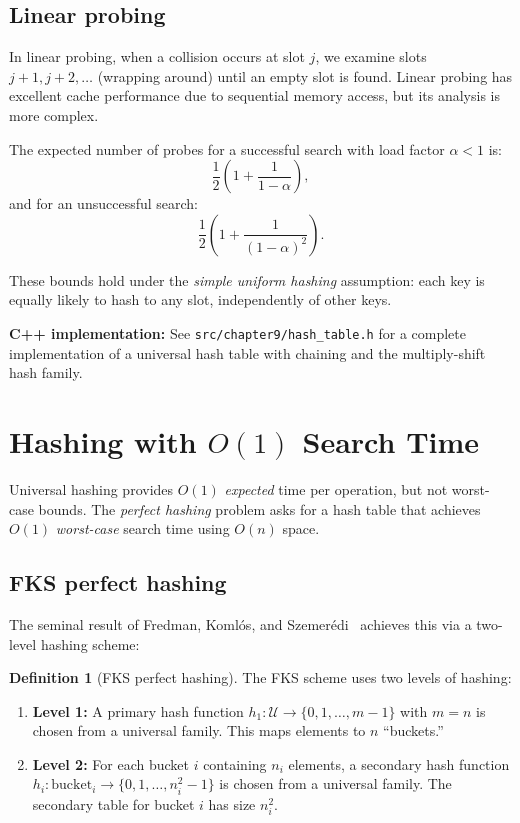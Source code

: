 \documentclass[twoside,12pt]{book}
\theoremstyle{plain}
\theoremstyle{definition}
\newtheorem{definition}[theorem]{Definition}
\theoremstyle{remark}
\newenvironment{cpplisting}{\begin{center}\small}{\end{center}}
\begin{document}
\subsection{Linear probing}

In linear probing, when a collision occurs at slot $j$, we examine slots $j+1, j+2, \ldots$ (wrapping around) until an empty slot is found. Linear probing has excellent cache performance due to sequential memory access, but its analysis is more complex.

The expected number of probes for a successful search with load factor $\alpha < 1$ is:
\[
\frac{1}{2}\left(1 + \frac{1}{1-\alpha}\right),
\]
and for an unsuccessful search:
\[
\frac{1}{2}\left(1 + \frac{1}{(1-\alpha)^2}\right).
\]

These bounds hold under the \emph{simple uniform hashing} assumption: each key is equally likely to hash to any slot, independently of other keys.

\begin{cpplisting}
\textbf{C++ implementation:} See \texttt{src/chapter9/hash\_table.h} for a complete
implementation of a universal hash table with chaining and the multiply-shift hash family.
\end{cpplisting}

\section{Hashing with \texorpdfstring{$O(1)$}{O(1)} Search Time}
\label{sec:perfect-hashing}

Universal hashing provides $O(1)$ \emph{expected} time per operation, but not worst-case bounds. The \emph{perfect hashing} problem asks for a hash table that achieves $O(1)$ \emph{worst-case} search time using $O(n)$ space.

\subsection{FKS perfect hashing}

The seminal result of Fredman, Koml\'{o}s, and Szemer\'{e}di~\cite{fredman1984} achieves this via a two-level hashing scheme:

\begin{definition}[FKS perfect hashing]
The FKS scheme uses two levels of hashing:
\begin{enumerate}[nosep]
    \item \textbf{Level 1:} A primary hash function $h_1: \mathcal{U} \to \{0, 1, \ldots, m-1\}$ with $m = n$ is chosen from a universal family. This maps elements to $n$ ``buckets.''
    \item \textbf{Level 2:} For each bucket $i$ containing $n_i$ elements, a secondary hash function $h_i: \text{bucket}_i \to \{0, 1, \ldots, n_i^2 - 1\}$ is chosen from a universal family. The secondary table for bucket $i$ has size $n_i^2$.
\end{enumerate}
\end{definition}
\end{document}

